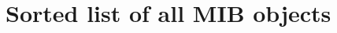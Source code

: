 \documentclass[a4paper, 12pt]{article}
\begin{document}
\appendix
\newpage
\section{Sorted list of all MIB objects}
\label{sec:snmp_exports:sorted}
\printnoidxglossary[type=snmp_all,style=tree,sort=letter]


\forallglsentries{\thislabel}%
{%
  \ifglsused{\thislabel}{}{\glsadd[format=ignore]{\thislabel}}%
}

%
\end{document}

